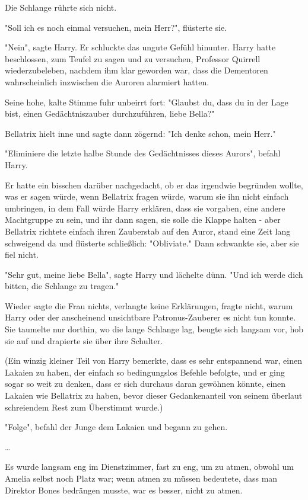 {Die Schlange rührte sich nicht.

"Soll ich es noch einmal versuchen, mein Herr?", flüsterte sie.

"Nein", sagte Harry. Er schluckte das ungute Gefühl hinunter. Harry hatte beschlossen, zum Teufel zu sagen und zu versuchen, Professor Quirrell wiederzubeleben, nachdem ihm klar geworden war, dass die Dementoren wahrscheinlich inzwischen die Auroren alarmiert hatten.

Seine hohe, kalte Stimme fuhr unbeirrt fort: "Glaubst du, dass du in der Lage bist, einen Gedächtniszauber durchzuführen, liebe Bella?"

Bellatrix hielt inne und sagte dann zögernd: "Ich denke schon, mein Herr."

"Eliminiere die letzte halbe Stunde des Gedächtnisses dieses Aurors", befahl Harry.

Er hatte ein bisschen darüber nachgedacht, ob er das irgendwie begründen wollte, was er sagen würde, wenn Bellatrix fragen würde, warum sie ihn nicht einfach umbringen, in dem Fall würde Harry erklären, dass sie vorgaben, eine andere Machtgruppe zu sein, und ihr dann sagen, sie solle die Klappe halten - aber Bellatrix richtete einfach ihren Zauberstab auf den Auror, stand eine Zeit lang schweigend da und flüsterte schließlich: "Obliviate." Dann schwankte sie, aber sie fiel nicht.

"Sehr gut, meine liebe Bella", sagte Harry und lächelte dünn. "Und ich werde dich bitten, die Schlange zu tragen."

Wieder sagte die Frau nichts, verlangte keine Erklärungen, fragte nicht, warum Harry oder der anscheinend unsichtbare Patronus-Zauberer es nicht tun konnte. Sie taumelte nur dorthin, wo die lange Schlange lag, beugte sich langsam vor, hob sie auf und drapierte sie über ihre Schulter.

(Ein winzig kleiner Teil von Harry bemerkte, dass es sehr entspannend war, einen Lakaien zu haben, der einfach so bedingungslos Befehle befolgte, und er ging sogar so weit zu denken, dass er sich durchaus daran gewöhnen könnte, einen Lakaien wie Bellatrix zu haben, bevor dieser Gedankenanteil von seinem überlaut schreiendem Rest zum Überstimmt wurde.)

"Folge", befahl der Junge dem Lakaien und begann zu gehen.

…

Es wurde langsam eng im Dienstzimmer, fast zu eng, um zu atmen, obwohl um Amelia selbst noch Platz war; wenn atmen zu müssen bedeutete, dass man Direktor Bones bedrängen musste, war es besser, nicht zu atmen.

}
